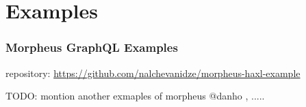 \section{Examples}

\begin{frame}\frametitle{Morpheus GraphQL Examples}

repository: \url{https://github.com/nalchevanidze/morpheus-haxl-example}

TODO: montion another exmaples of morpheus @danho , .....

\end{frame}